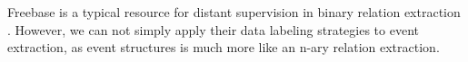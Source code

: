  
%
%
%
%
%

Freebase is a typical resource for distant supervision in binary relation extraction \cite{mintz2009distant,zeng2015distant}. 
However, we can not simply apply their data labeling strategies to event extraction, as event structures is much more like 
an n-ary relation extraction.
